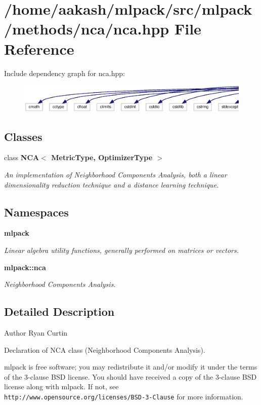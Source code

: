 \section{/home/aakash/mlpack/src/mlpack/methods/nca/nca.hpp File Reference}
\label{nca_8hpp}
Include dependency graph for nca.\+hpp\+:
\nopagebreak
\begin{figure}[H]
\begin{center}
\leavevmode
\includegraphics[width=350pt]{nca_8hpp__incl}
\end{center}
\end{figure}
\subsection*{Classes}
\begin{DoxyCompactItemize}
\item 
class \textbf{ N\+C\+A$<$ Metric\+Type, Optimizer\+Type $>$}
\begin{DoxyCompactList}\small\item\em An implementation of Neighborhood Components Analysis, both a linear dimensionality reduction technique and a distance learning technique. \end{DoxyCompactList}\end{DoxyCompactItemize}
\subsection*{Namespaces}
\begin{DoxyCompactItemize}
\item 
 \textbf{ mlpack}
\begin{DoxyCompactList}\small\item\em Linear algebra utility functions, generally performed on matrices or vectors. \end{DoxyCompactList}\item 
 \textbf{ mlpack\+::nca}
\begin{DoxyCompactList}\small\item\em Neighborhood Components Analysis. \end{DoxyCompactList}\end{DoxyCompactItemize}


\subsection{Detailed Description}
\begin{DoxyAuthor}{Author}
Ryan Curtin
\end{DoxyAuthor}
Declaration of N\+CA class (Neighborhood Components Analysis).

mlpack is free software; you may redistribute it and/or modify it under the terms of the 3-\/clause B\+SD license. You should have received a copy of the 3-\/clause B\+SD license along with mlpack. If not, see {\tt http\+://www.\+opensource.\+org/licenses/\+B\+S\+D-\/3-\/\+Clause} for more information. 